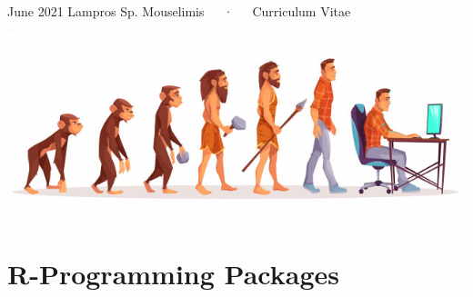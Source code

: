 \documentclass[11pt, a4paper]{awesome-cv}
\begin{document}
\makecvheader

\makecvfooter
  {June 2021}
    {Lampros Sp. Mouselimis~~~·~~~Curriculum Vitae}
  {\thepage}





\includegraphics{human_evolution.jpg}

\hypertarget{r-programming-packages}{%
\section{R-Programming Packages}\label{r-programming-packages}}
\end{document}
